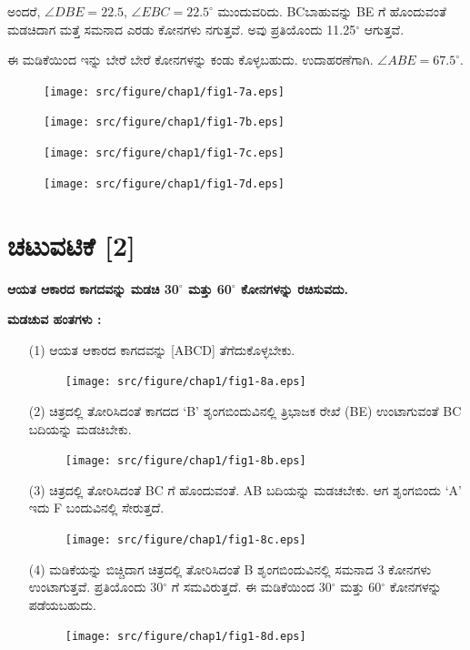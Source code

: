 \smallskip
ಅಂದರೆ, $\angle DBE = 22.5$, $\angle EBC = 22.5^\circ$ ಮುಂದುವರಿದು. BC\break ಬಾಹುವನ್ನು BE ಗೆ ಹೊಂದುವಂತೆ ಮಡಚಿದಾಗ ಮತ್ತೆ ಸಮನಾದ ಎರಡು ಕೋನಗಳು ನಗುತ್ತವೆ. ಅವು ಪ್ರತಿಯೊಂದು 11.25$^\circ$ ಆಗುತ್ತವೆ. 

\smallskip
ಈ ಮಡಿಕೆಯಿಂದ ಇನ್ನು ಬೇರೆ ಬೇರೆ ಕೋನಗಳನ್ನು ಕಂಡು ಕೊಳ್ಳಬಹುದು. ಉದಾ\break ಹರಣೆಗಾಗಿ.  $\angle ABE = 67.5^\circ$.
\begin{figure}[H]
\centering
\texttt{[image: src/figure/chap1/fig1-7a.eps]}
\end{figure}
\begin{figure}[H]
\centering
\texttt{[image: src/figure/chap1/fig1-7b.eps]}
\end{figure}
\begin{figure}[H]
\centering
\texttt{[image: src/figure/chap1/fig1-7c.eps]}
\end{figure}
\begin{figure}[H]
\centering
\texttt{[image: src/figure/chap1/fig1-7d.eps]}
\end{figure}


\section*{ಚಟುವಟಿಕೆ [2]} \textbf{ಆಯತ ಆಕಾರದ ಕಾಗದವನ್ನು ಮಡಚಿ 30$^\circ$ ಮತ್ತು 60$^\circ$ ಕೋನಗಳನ್ನು ರಚಿಸುವದು.} 

\textbf{ಮಡಚುವ ಹಂತಗಳು :}
\begin{enumerate}
\item[(1)] ಆಯತ ಆಕಾರದ ಕಾಗದವನ್ನು [ABCD] ತೆಗೆದುಕೊಳ್ಳಬೇಕು.
\begin{figure}[H]
\centering
\texttt{[image: src/figure/chap1/fig1-8a.eps]}
\end{figure}

\item[(2)] ಚಿತ್ರದಲ್ಲಿ ತೋರಿಸಿದಂತೆ ಕಾಗದದ `B' ಶೃಂಗಬಿಂದುವಿನಲ್ಲಿ ತ್ರಿಭಾಜಕ ರೇಖೆ  (BE) ಉಂಟಾಗುವಂತೆ BC ಬದಿಯನ್ನು ಮಡಚಿಬೇಕು.
\begin{figure}[H]
\centering
\texttt{[image: src/figure/chap1/fig1-8b.eps]}
\end{figure}

\item[(3)] ಚಿತ್ರದಲ್ಲಿ ತೋರಿಸಿದಂತೆ  BC ಗೆ ಹೊಂದುವಂತೆ.  AB ಬದಿಯನ್ನು ಮಡಚಬೇಕು.  ಆಗ ಶೃಂಗಬಿಂದು `A' ಇದು  F ಬಂದುವಿನಲ್ಲಿ ಸೇರುತ್ತದೆ. 
\begin{figure}[H]
\centering
\texttt{[image: src/figure/chap1/fig1-8c.eps]}
\end{figure}

\item[(4)] ಮಡಿಕೆಯನ್ನು ಬಿಚ್ಚಿದಾಗ ಚಿತ್ರದಲ್ಲಿ ತೋರಿಸಿದಂತೆ B ಶೃಂಗಬಿಂದುವಿನಲ್ಲಿ ಸಮನಾದ  3 ಕೋನಗಳು ಉಂಟಾಗುತ್ತವೆ. ಪ್ರತಿಯೊಂದು 30$^\circ$ ಗೆ ಸಮವಿರುತ್ತದೆ. ಈ ಮಡಿಕೆಯಿಂದ 30$^\circ$ ಮತ್ತು 60$^\circ$ ಕೋನಗಳನ್ನು ಪಡೆಯಬಹುದು. 
\begin{figure}[H]
\centering
\texttt{[image: src/figure/chap1/fig1-8d.eps]}
\end{figure}
\end{enumerate}


